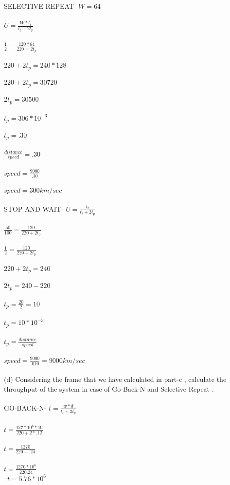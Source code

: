 \documentclass[a4paper,12pt]{article}
\begin{document}
SELECTIVE REPEAT-
$W=64$\\\\
$U=\frac{W*t_{t}}{t_{t}+2t_{p}}$\\\\
$\frac{1}{2}=\frac{120*64}{220=2t_{p}}$\\\\
$220+2t_{p}=240*128$\\\\
$220+2t_{p}=30720$\\\\
$2t_{p}=30500$\\\\
$t_{p}=306*10^{-3}$\\\\
$t_{p}=.30$\\\\
$\frac{distance}{speed}=.30$\\\\
$speed=\frac{9000}{.30}$\\\\
$speed=300 km/sec$\\\\

STOP AND WAIT-
$U=\frac{t_{t}}{t_{t}+2t_{p}}$\\\\
$\frac{50}{100}=\frac{120}{220+2t_{p}}$\\\\
$\frac{1}{2}=\frac{120}{220+2t_{p}}$\\\\
$220+2t_{p}=240$\\\\
$2t_{p}=240-220$\\\\
$t_{p}=\frac{20}{2}=10$\\\\
$t_{p}=10*10^{-3}$\\\\
$t_{p}=\frac{distance}{speed}$\\\\
$speed=\frac{9000}{.010}=9000 km/sec$\\\\
(d) Considering the frame that we have calculated in part-c , calculate the throughput
of the system in case of Go-Back-N and Selective Repeat .\\\\

GO-BACK-N-
$t=\frac{w*d}{t_{t}+2t_{p}}$\\\\
$t=\frac{127*10^{6}*10}{220+2*.12}$\\\\
$t=\frac{1270}{220+.24}$\\\\
$t=\frac{1270*10^{6}}{220.24}$\\\
$t=5.76*10^{6}$\\\
\end{document}

